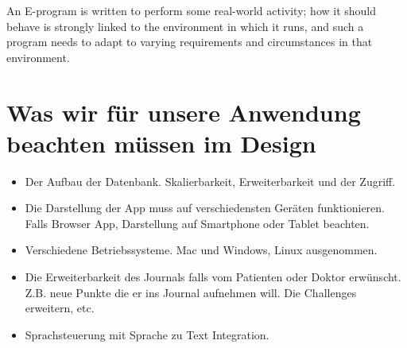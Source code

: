 An E-program is written to perform some real-world activity; how it should behave is strongly linked to the environment in which it runs, and such a program needs to adapt to varying requirements and circumstances in that environment.

\section{Was wir f\"{u}r unsere Anwendung beachten m\"{u}ssen im Design}

\begin{itemize}
    \item{Der Aufbau der Datenbank. Skalierbarkeit, Erweiterbarkeit und der Zugriff.}
    \item{Die Darstellung der App muss auf verschiedensten Ger\"{a}ten funktionieren. Falls Browser App, Darstellung auf Smartphone oder Tablet beachten.}
    \item{Verschiedene Betriebssysteme. Mac und Windows, Linux ausgenommen.}
    \item{Die Erweiterbarkeit des Journals falls vom Patienten oder Doktor erw\"{u}nscht. Z.B. neue Punkte die er ins Journal aufnehmen will. Die Challenges erweitern, etc.}
    \item{Sprachsteuerung mit Sprache zu Text Integration.}
\end{itemize}
